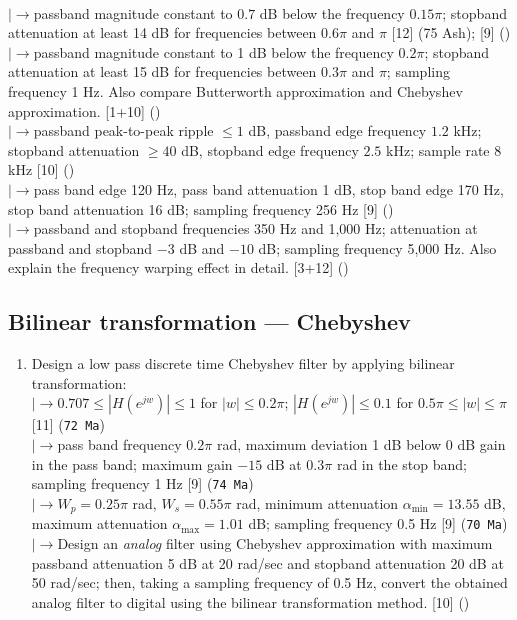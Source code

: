 \documentclass[12pt]{article}
\newcommand{\lb}{\\$\left|\rightarrow\right.$}
\begin{document}
\begin{enumerate}[topsep=0pt, noitemsep]
        \lb passband magnitude constant to $0.7$ dB below the frequency $0.15\pi$; stopband attenuation at least 14 dB for frequencies between $0.6\pi$ and $\pi$ \hfill [12] (75 Ash); \hfill [9] ()
        \lb passband magnitude constant to 1 dB below the frequency $0.2\pi$; stopband attenuation at least 15 dB for frequencies between $0.3\pi$ and $\pi$; sampling frequency 1 Hz. Also compare Butterworth approximation and Chebyshev approximation. \hfill [1+10] ()
        \lb passband peak-to-peak ripple $\le1$ dB, passband edge frequency $1.2$ kHz; stopband attenuation $\ge40$ dB, stopband edge frequency $2.5$ kHz; sample rate 8 kHz \hfill [10] ()
        \lb pass band edge 120 Hz, pass band attenuation 1 dB, stop band edge 170 Hz, stop band attenuation 16 dB; sampling frequency 256 Hz \hfill [9] ()
        \lb passband and stopband frequencies 350 Hz and 1,000 Hz; attenuation at passband and stopband $-3$ dB and $-10$ dB; sampling frequency 5,000 Hz. Also explain the frequency warping effect in detail. \hfill [3+12] ()
    \end{enumerate}

  \subsection{Bilinear transformation --- Chebyshev}
    \begin{enumerate}[topsep=0pt, noitemsep]
      \item Design a low pass discrete time Chebyshev filter by applying bilinear transformation:
        \lb $0.707\le|H(e^{jw})|\le1$ for $|w|\le0.2\pi$; $|H(e^{jw})|\le0.1$ for $0.5\pi\le|w|\le\pi$ \hfill [11] (\texttt{72 Ma})
        \lb pass band frequency $0.2\pi$ rad, maximum deviation 1 dB below 0 dB gain in the pass band; maximum gain $-15$ dB at $0.3\pi$ rad in the stop band; sampling frequency 1 Hz \hfill [9] (\texttt{74 Ma})
        \lb $W_p=0.25\pi$ rad, $W_s=0.55\pi$ rad, minimum attenuation $\alpha_{\min}=13.55$ dB, maximum attenuation $\alpha_{\max}=1.01$ dB; sampling frequency 0.5 Hz \hfill [9] (\texttt{70 Ma})
        \lb Design an \emph{analog} filter using Chebyshev approximation with maximum passband attenuation 5 dB at 20 rad/sec and stopband attenuation 20 dB at 50 rad/sec; then, taking a sampling frequency of 0.5 Hz, convert the obtained analog filter to digital using the bilinear transformation method. \hfill [10] ()
    \end{enumerate}
\end{document}

